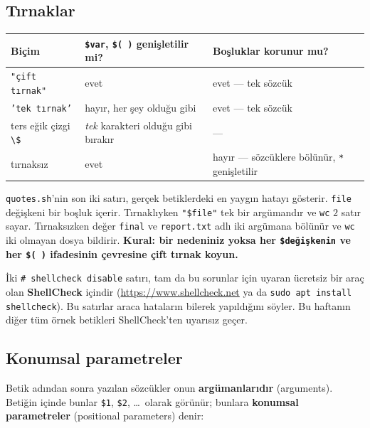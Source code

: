 \documentclass[11pt,a4paper]{article}
\newcommand{\term}[1]{\textbf{\color{mintdeep}#1}}
\newcommand{\cmd}[1]{\texttt{#1}}
\begin{document}
\subsection{Tırnaklar}
\label{sec:quoting}




\begin{center}
\small
\begin{tabular}{@{}lll@{}}
\toprule
\textbf{Biçim} & \textbf{\texttt{\$var}, \texttt{\$( )} genişletilir mi?} & \textbf{Boşluklar korunur mu?}\\
\midrule
\texttt{"çift tırnak"} & evet & evet --- tek sözcük\\
\texttt{'tek tırnak'} & hayır, her şey olduğu gibi & evet --- tek sözcük\\
ters eğik çizgi \texttt{\textbackslash\$} & \emph{tek} karakteri olduğu gibi bırakır & ---\\
tırnaksız & evet & hayır --- sözcüklere bölünür, \texttt{*} genişletilir\\
\bottomrule
\end{tabular}
\end{center}

\texttt{quotes.sh}'nin son iki satırı, gerçek betiklerdeki en yaygın hatayı gösterir. \texttt{file} değişkeni bir boşluk içerir. Tırnaklıyken \texttt{"\$file"} tek bir argümandır ve \cmd{wc} $2$ satır sayar. Tırnaksızken değer \texttt{final} ve \texttt{report.txt} adlı iki argümana bölünür ve \cmd{wc} iki olmayan dosya bildirir. \textbf{Kural: bir nedeniniz yoksa her \texttt{\$değişkenin} ve her \texttt{\$( )} ifadesinin çevresine çift tırnak koyun.}

İki \texttt{\# shellcheck disable} satırı, tam da bu sorunlar için uyaran ücretsiz bir araç olan \term{ShellCheck} içindir (\url{https://www.shellcheck.net} ya da \cmd{sudo apt install shellcheck}). Bu satırlar araca hataların bilerek yapıldığını söyler. Bu haftanın diğer tüm örnek betikleri ShellCheck'ten uyarısız geçer.

\subsection{Konumsal parametreler}

Betik adından sonra yazılan sözcükler onun \term{argümanlarıdır} (arguments). Betiğin içinde bunlar \texttt{\$1}, \texttt{\$2}, \ldots\ olarak görünür; bunlara \term{konumsal parametreler} (positional parameters) denir:
\end{document}
